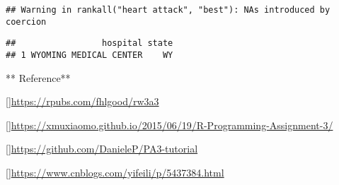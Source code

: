 \documentclass[]{article}
\begin{document}
\begin{verbatim}
## Warning in rankall("heart attack", "best"): NAs introduced by coercion
\end{verbatim}

\begin{verbatim}
##                 hospital state
## 1 WYOMING MEDICAL CENTER    WY
\end{verbatim}

** Reference**

{[}{]}\url{https://rpubs.com/fhlgood/rw3a3}

{[}{]}\url{https://xmuxiaomo.github.io/2015/06/19/R-Programming-Assignment-3/}

{[}{]}\url{https://github.com/DanieleP/PA3-tutorial}

{[}{]}\url{https://www.cnblogs.com/yifeili/p/5437384.html}
\end{document}
